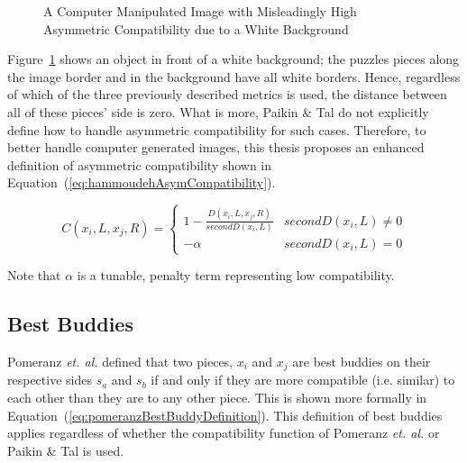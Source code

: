 \documentclass{report}
\def\eref#1{(\ref{#1})}
\begin{document}
\begin{figure}
\centering
{}
\caption{A Computer Manipulated Image with Misleadingly High Asymmetric Compatibility due to a White Background}
\label{fig:objectWhiteBackground}
\end{figure}

Figure~\ref{fig:objectWhiteBackground} shows an object in front of a white background; the puzzles pieces along the image border and in the background have all white borders.  Hence, regardless of which of the three previously described metrics is used, the distance between all of these pieces' side is zero.  What is more, Paikin \& Tal do not explicitly define how to handle asymmetric compatibility for such cases.  Therefore, to better handle computer generated images, this thesis proposes an enhanced definition of asymmetric compatibility shown in Equation~\eref{eq:hammoudehAsymCompatibility}.  

\begin{equation} \label{eq:hammoudehAsymCompatibility}
C(x_i,L,x_j,R)= \begin{cases} 
	1 - \frac{D(x_i,L,x_j,R)}{secondD(x_i,L)} & secondD(x_i,L) \ne 0
\\
	-\alpha & secondD(x_i,L) = 0
\end{cases} 
\end{equation}

\noindent
Note that $\alpha$ is a tunable, penalty term representing low compatibility.


\subsection{Best Buddies}\label{sec:bestBuddies}

Pomeranz \textit{et. al.} defined that two pieces, $x_i$ and $x_j$ are best buddies on their respective sides $s_a$ and $s_b$ if and only if they are more compatible (i.e. similar) to each other than they are to any other piece.  This is shown more formally in Equation~\eref{eq:pomeranzBestBuddyDefinition}.  This definition of best buddies applies regardless of whether the compatibility function of Pomeranz \textit{et. al.} or Paikin \& Tal is used.
\end{document}
